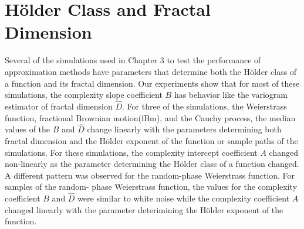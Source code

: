 \section{H\"older Class and Fractal Dimension}



Several of the simulations used in Chapter 3 to test the 
performance of approximation methods have  parameters that 
determine both the H\"older class of a function and its 
fractal dimension. Our experiments show that for most 
of these simulations, the complexity slope coefficient 
$B$ has behavior like the variogram estimator of
fractal dimension $\hat D$. For three of the simulations, 
the Weierstrass function, fractional Brownian motion(fBm), 
and the Cauchy process, the median values of the 
$B$ and $\hat D$ change linearly with the parameters 
determining both fractal dimension and the H\"older 
exponent of the function or sample paths of the simulations.
For these simulations, the complexity intercept coefficient $A$
changed non-linearly as the parameter determining the 
H\"older class of a function changed. A different 
pattern was observed for the random-phase
Weierstrass function. For samples of the random- 
phase Weierstrass function, the values for the 
complexity coefficient $B$ and $\hat D$ were similar 
to white noise while the complexity
coefficient $A$ changed linearly with the parameter 
deterimining the H\"older exponent of the function.

